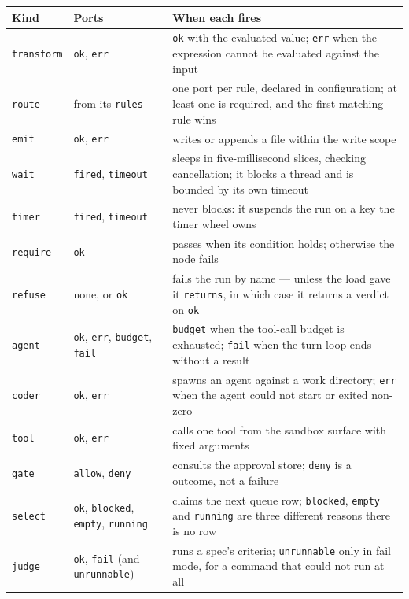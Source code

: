 \begin{longtable}{@{}p{}p{}p{}@{}}
	\toprule
	\textbf{Kind} & \textbf{Ports} & \textbf{When each fires} \\
	\midrule
	\endhead
	\texttt{transform} & \texttt{ok}, \texttt{err} & \texttt{ok} with the evaluated value; \texttt{err}
	when the expression cannot be evaluated against the input \\
	\texttt{route} & from its \texttt{rules} & one port per rule, declared in configuration; at least
	one is required, and the first matching rule wins \\
	\texttt{emit} & \texttt{ok}, \texttt{err} & writes or appends a file within the write scope \\
	\texttt{wait} & \texttt{fired}, \texttt{timeout} & sleeps in five-millisecond slices, checking
	cancellation; it blocks a thread and is bounded by its own timeout \\
	\texttt{timer} & \texttt{fired}, \texttt{timeout} & never blocks: it suspends the run on a key the
	timer wheel owns \\
	\texttt{require} & \texttt{ok} & passes when its condition holds; otherwise the node fails \\
	\texttt{refuse} & none, or \texttt{ok} & fails the run by name --- unless the load gave it
	\texttt{returns}, in which case it returns a verdict on \texttt{ok} \\
	\texttt{agent} & \texttt{ok}, \texttt{err}, \texttt{budget}, \texttt{fail} & \texttt{budget} when
	the tool-call budget is exhausted; \texttt{fail} when the turn loop ends without a result \\
	\texttt{coder} & \texttt{ok}, \texttt{err} & spawns an agent against a work directory; \texttt{err}
	when the agent could not start or exited non-zero \\
	\texttt{tool} & \texttt{ok}, \texttt{err} & calls one tool from the sandbox surface with fixed
	arguments \\
	\texttt{gate} & \texttt{allow}, \texttt{deny} & consults the approval store; \texttt{deny} is a
	outcome, not a failure \\
	\texttt{select} & \texttt{ok}, \texttt{blocked}, \texttt{empty}, \texttt{running} & claims the
	next queue row; \texttt{blocked}, \texttt{empty} and \texttt{running} are three different
	reasons there is no row \\
	\texttt{judge} & \texttt{ok}, \texttt{fail} (and \texttt{unrunnable}) & runs a spec's criteria;
	\texttt{unrunnable} only in fail mode, for a command that could not run at all \\

\end{longtable}
